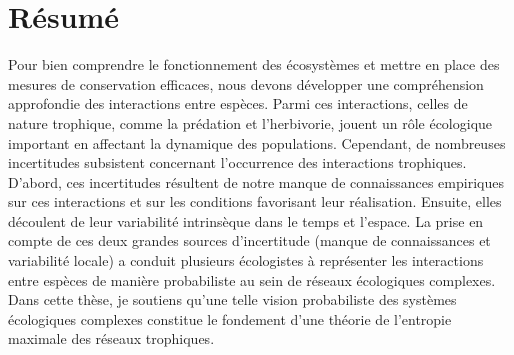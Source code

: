 \documentclass[12pt,twoside,phd]{dms}
\numberwithin{equation}{section}
\numberwithin{table}{chapter}
\numberwithin{figure}{chapter}
\begin{document}
\maketitle
\newpage
\maketitle

\doublespacing


\francais

\chapter*{Résumé}

Pour bien comprendre le fonctionnement des écosystèmes et mettre en place des
mesures de conservation efficaces, nous devons développer une compréhension
approfondie des interactions entre espèces. Parmi ces interactions, celles de
nature trophique, comme la prédation et l'herbivorie, jouent un rôle écologique
important en affectant la dynamique des populations. Cependant, de nombreuses
incertitudes subsistent concernant l'occurrence des interactions trophiques.
D'abord, ces incertitudes résultent de notre manque de connaissances empiriques
sur ces interactions et sur les conditions favorisant leur réalisation. Ensuite,
elles découlent de leur variabilité intrinsèque dans le temps et l'espace. La
prise en compte de ces deux grandes sources d'incertitude (manque de
connaissances et variabilité locale) a conduit plusieurs écologistes à
représenter les interactions entre espèces de manière probabiliste au sein de
réseaux écologiques complexes. Dans cette thèse, je soutiens qu'une telle vision
probabiliste des systèmes écologiques complexes constitue le fondement d'une
théorie de l'entropie maximale des réseaux trophiques. 
\end{document}
